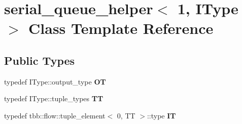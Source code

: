 \hypertarget{classserial__queue__helper_3_011_00_01IType_01_4}{}\section{serial\+\_\+queue\+\_\+helper$<$ 1, I\+Type $>$ Class Template Reference}
\label{classserial__queue__helper_3_011_00_01IType_01_4}
\subsection*{Public Types}
\begin{DoxyCompactItemize}
\item 
\hypertarget{classserial__queue__helper_3_011_00_01IType_01_4_ac8608485c2dd7cefddd699b6125f2ff8}{}typedef I\+Type\+::output\+\_\+type {\bfseries O\+T}\label{classserial__queue__helper_3_011_00_01IType_01_4_ac8608485c2dd7cefddd699b6125f2ff8}

\item 
\hypertarget{classserial__queue__helper_3_011_00_01IType_01_4_a3e4f5dbac62456b66f1cf7cac9750d52}{}typedef I\+Type\+::tuple\+\_\+types {\bfseries T\+T}\label{classserial__queue__helper_3_011_00_01IType_01_4_a3e4f5dbac62456b66f1cf7cac9750d52}

\item 
\hypertarget{classserial__queue__helper_3_011_00_01IType_01_4_a1a4832e0dc7c27276681009ca8f12baf}{}typedef tbb\+::flow\+::tuple\+\_\+element$<$ 0, T\+T $>$\+::type {\bfseries I\+T}\label{classserial__queue__helper_3_011_00_01IType_01_4_a1a4832e0dc7c27276681009ca8f12baf}

\end{DoxyCompactItemize}
